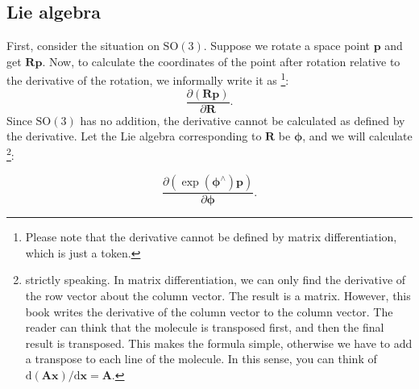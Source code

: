 \subsection{Lie algebra}
First, consider the situation on $\mathrm{SO}(3)$. Suppose we rotate a space point $\bm{p}$ and get $\bm{R} \bm{p}$. Now, to calculate the coordinates of the point after rotation relative to the derivative of the rotation, we informally write it as \footnote{Please note that the derivative cannot be defined by matrix differentiation, which is just a token. }:
\[
\frac{{\partial \left( {\bm{Rp}} \right)}}{{\partial \bm{R}}}.
\]
Since $\mathrm{SO}(3)$ has no addition, the derivative cannot be calculated as defined by the derivative. Let the Lie algebra corresponding to $\bm{R}$ be $\boldsymbol{\phi}$, and we will calculate \footnote{ strictly speaking. In matrix differentiation, we can only find the derivative of the row vector about the column vector. The result is a matrix. However, this book writes the derivative of the column vector to the column vector. The reader can think that the molecule is transposed first, and then the final result is transposed. This makes the formula simple, otherwise we have to add a transpose to each line of the molecule. In this sense, you can think of $\mathrm{d}(\bm{Ax})/\mathrm{d}\bm{x} = \bm{A}$.}:

\[ \frac{{\partial \left( {\exp \left( \boldsymbol{\phi} ^ \wedge \right) \bm{p}} \right)}}{{\partial \boldsymbol{\phi} }}. \]


